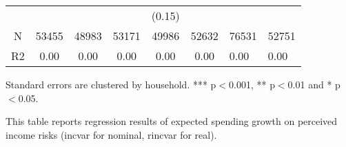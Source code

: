 \documentclass[12pt,notitlepage,onecolumn,aps,pra]{article}
\begin{document}
\begin{table}[p]
\begin{adjustbox}{width={0.9\textwidth}}
\begin{threeparttable}
\begin{tabular}{ccccccll}
          &            &             &              &        (0.15) &                &                 &                  \\
N         &      53455 &       48983 &        53171 &         49986 &          52632 &           76531 &            52751 \\
R2        &       0.00 &        0.00 &         0.00 &          0.00 &           0.00 &            0.00 &             0.00 \\
\bottomrule
\end{tabular}
\begin{tablenotes}\item Standard errors are clustered by household. *** p$<$0.001, ** p$<$0.01 and * p$<$0.05. 
\item This table reports regression results of expected spending growth on perceived income risks (incvar for nominal, rincvar for real).
\end{tablenotes}
\end{threeparttable}
\end{adjustbox}
\end{table}       %
    
    



    
\end{document}
